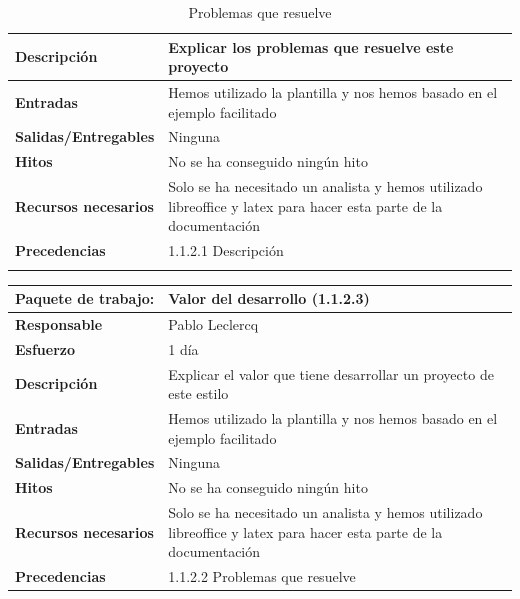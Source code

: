\documentclass{report}
\begin{document}
\begin{center}
\begin{longtable}{|p{6cm}|p{6cm}|}
                    \textbf{Descripción} & Explicar los problemas que resuelve este proyecto\\
                    \hline
                    \textbf{Entradas} & Hemos utilizado la plantilla y nos hemos basado en el ejemplo facilitado\\
                    \hline
                    \textbf{Salidas/Entregables} & Ninguna\\
                    \hline
                    \textbf{Hitos} & No se ha conseguido ningún hito\\
                    \hline
                    \textbf{Recursos necesarios} & Solo se ha necesitado un analista y hemos utilizado libreoffice y latex para hacer esta parte de la documentación\\
                    \hline
                    \textbf{Precedencias} & 1.1.2.1 Descripción\\
                    \hline
                    \caption{Problemas que resuelve}
                \end{longtable}
                \begin{longtable}{|p{6cm}|p{6cm}|}
                    \hline
                    \textbf{Paquete de trabajo:} & Valor del desarrollo (1.1.2.3)\\
                    \hline
                    \textbf{Responsable} & Pablo Leclercq\\
                    \hline
                    \textbf{Esfuerzo} & 1 día\\
                    \hline
                    \textbf{Descripción} & Explicar el valor que tiene desarrollar un proyecto de este estilo\\
                    \hline
                    \textbf{Entradas} & Hemos utilizado la plantilla y nos hemos basado en el ejemplo facilitado\\
                    \hline
                    \textbf{Salidas/Entregables} & Ninguna\\
                    \hline
                    \textbf{Hitos} & No se ha conseguido ningún hito\\
                    \hline
                    \textbf{Recursos necesarios} & Solo se ha necesitado un analista y hemos utilizado libreoffice y latex para hacer esta parte de la documentación\\
                    \hline
                    \textbf{Precedencias} & 1.1.2.2 Problemas que resuelve\\
                    \hline

\end{longtable}
\end{center}
\end{document}
